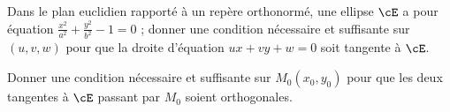 \begin{enonce}
\begin{exercise}[ID={Bloc Vuibert4 191},subtitle={},tags={}]
Dans le plan euclidien rapporté à un repère orthonormé, une ellipse $\cE$ a pour équation
$\frac{x^2}{a^2}+\frac{y^2}{b^2}-1=0$ ; donner une condition nécessaire et suffisante sur $(u,v,w)$ pour que la droite d'équation $ux+vy+w=0$ soit tangente à $\cE$.

Donner une condition nécessaire et suffisante sur $M_0(x_0,y_0)$ pour que les deux tangentes à $\cE$ passant par $M_0$ soient orthogonales.
\end{exercise}
\end{enonce}
